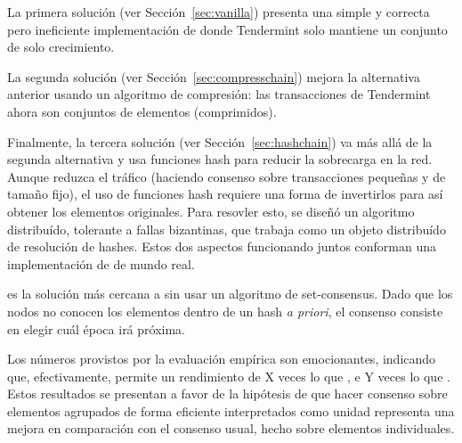 %
La primera solución (ver Sección~\ref{sec:vanilla}) presenta una simple y
correcta pero ineficiente implementación de \setchain donde Tendermint solo mantiene
un conjunto de solo crecimiento.

%
La segunda solución (ver Sección~\ref{sec:compresschain}) mejora la alternativa anterior
usando un algoritmo de compresión: las transacciones de Tendermint ahora son conjuntos
de elementos (comprimidos).

%
Finalmente, la tercera solución (ver Sección~\ref{sec:hashchain}) va más allá de la
segunda alternativa y usa funciones hash para reducir la sobrecarga en la red.
Aunque reduzca el tráfico (haciendo consenso sobre transacciones pequeñas
y de tamaño fijo), el uso de funciones hash requiere una forma de
invertirlos para así obtener los elementos originales.
Para resovler esto, se diseñó
un algoritmo distribuído, tolerante a fallas bizantinas, que trabaja como un objeto
distribuído de resolución de hashes.
Estos dos aspectos funcionando juntos conforman una implementación de \setchain
de mundo real.

%
\hashchain es la solución más cercana a \setchain sin usar un algoritmo de set-consensus.
Dado que los nodos no conocen los elementos dentro de un hash \emph{a priori}, el
consenso consiste en elegir cuál época irá próxima.
%


Los números provistos por la evaluación empírica son emocionantes, indicando que,
efectivamente, \hashchain permite un rendimiento de X veces lo que \vanilla, e Y veces
lo que \compresschain.
Estos resultados se presentan a favor de la hipótesis de que hacer consenso sobre
elementos agrupados de forma eficiente interpretados como unidad representa una
mejora en comparación con el consenso usual, hecho sobre elementos individuales. 

